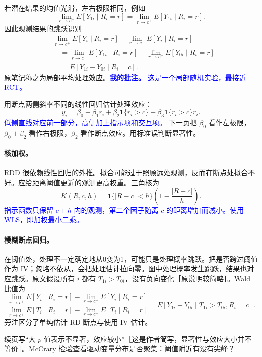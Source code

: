 \documentclass[11pt,a4paper]{article}
\newcommand{\inkblue}[1]{\textcolor{blue}{#1}}
\begin{document}
{若潜在结果的均值光滑，左右极限相同，例如
\[\lim_{r\to c^-}E[Y_{1i}\mid R_i=r]=\lim_{r\to c^+}E[Y_{1i}\mid R_i=r].\]
因此观测结果的跳跃识别
\begin{align*}
&\lim_{r\to c^+}E[Y_i\mid R_i=r]-\lim_{r\to c^-}E[Y_i\mid R_i=r]\\
&\quad=\lim_{r\to c^+}E[Y_{1i}\mid R_i=r]-\lim_{r\to c^-}E[Y_{0i}\mid R_i=r]\\
&\quad=E[Y_{1i}-Y_{0i}\mid R_i=c].
\end{align*}
原笔记称之为局部平均处理效应。\inkblue{\textbf{我的批注。} 这是一个局部随机实验，最接近 RCT。}

用断点两侧斜率不同的线性回归估计处理效应：
\[y_i=\beta_0+\beta_1r_i+\beta_2\mathbf1\{r_i>c\}+\beta_3\mathbf1\{r_i>c\}r_i.\]
\inkblue{低侧直线对应前一部分，高侧加上指示项和交互项。} 下一页把 $\beta_0$ 看作左极限，$\beta_0+\beta_2$ 看作右极限，$\beta_2$ 看作断点效应。用标准误判断显著性。

\paragraph{核加权。}
RDD 很依赖线性回归的外推。拟合可能过于照顾远处观测，反而在断点处拟合不好。应给距离阈值更近的观测更高权重。三角核为
\[K(R,c,h)=\mathbf1\{|R-c|<h\}\left(1-\frac{|R-c|}{h}\right).\]
\inkblue{指示函数只保留 $c\pm h$ 内的观测，第二个因子随离 $c$ 的距离增加而减小。使用 WLS，即加权最小二乘。}

\paragraph{模糊断点回归。}
在阈值处，处理不一定确定地从0变为1，可能只是处理概率跳跃。把是否跨过阈值作为 IV；忽略不依从，会把处理估计拉向零。图中处理概率发生跳跃，结果也对应跳跃。原文假设所有 $i$ 都有 $T_{1i}>T_{0i}$，没有负向变化［原说明较简略］。Wald 比值为
\[
\frac{\lim_{r\to c^+}E[Y_i\mid R_i=r]-\lim_{r\to c^-}E[Y_i\mid R_i=r]}
{\lim_{r\to c^+}E[T_i\mid R_i=r]-\lim_{r\to c^-}E[T_i\mid R_i=r]}
=E[Y_{1i}-Y_{0i}\mid T_{1i}>T_{0i},R_i=c].
\]
旁注区分了单纯估计 RD 断点与使用 IV 估计。

续页写“大 $p$ 值表示不显著，效应较小”［这是作者简写，显著性与效应大小并不等价］。McCrary 检验查看驱动变量分布是否聚集：阈值附近有没有尖峰？

\begin{center}
\begin{tikzpicture}[>=Stealth, font=\small, line width=.65pt]


\end{tikzpicture}
\end{center}}
\end{document}
